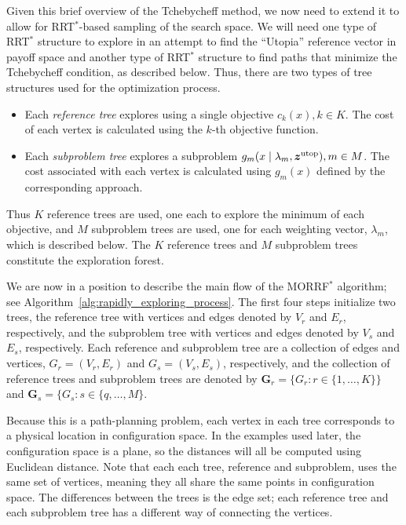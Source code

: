 \documentclass{article}
\begin{document}
Given this brief overview of the Tchebycheff method, we now need to extend it to allow for RRT$^{*}$-based sampling of the search space.  
We will need one type of RRT$^{*}$ structure to explore in an attempt to find the ``Utopia'' reference vector in payoff space and another type of RRT$^{*}$ structure to find paths that minimize the Tchebycheff condition, as described below.  
Thus, there are two types of tree structures used for the optimization process.
\begin{itemize}
\item Each \emph{reference tree} explores using a single objective $ c_{k} (x), k \in K $. 
The cost of each vertex is calculated using the $ k $-th objective function.
\item Each \emph{subproblem tree} explores a subproblem $ g_{m} ( x \mid \lambda_{m} , \bm{z}^{\rm utop} ) , m \in M $.
The cost associated with each vertex is calculated using $ g_{m}(x) $ defined by the corresponding approach.
\end{itemize}
Thus $ K $ reference trees are used, one each to explore the minimum of each objective, and $ M $ subproblem trees are used, one for each weighting vector, $ \lambda_{m} $, which is described below.  
The $K$ reference trees and $M$ subproblem trees constitute the exploration forest.

We are now in a position to describe the main flow of the MORRF$^{*}$ algorithm; see Algorithm~\ref{alg:rapidly_exploring_process}.  
The first four steps initialize two trees, the reference tree with vertices and edges denoted by $V_r$ and $E_r$, respectively, and the subproblem tree with vertices and edges denoted by $V_s$ and $E_s$, respectively.  
Each reference and subproblem tree are a collection of edges and vertices, $G_r=(V_r,E_r)$ and $G_s=(V_s,E_s)$, respectively, and the collection of reference trees and subproblem trees are denoted by ${\mathbf G}_r = \{G_r: r\in \{1, \ldots, K\}\}$ and ${\mathbf G}_s = \{G_s: s \in \{q, \ldots, M\}$.  

Because this is a path-planning problem, each vertex in each tree corresponds to a physical location in configuration space.  
In the examples used later, the configuration space is a plane, so the distances will all be computed using Euclidean distance. 
Note that each each tree, reference and subproblem, uses the same set of vertices, meaning they all share the same points in configuration space.  
The differences between the trees is the edge set; each reference tree and each subproblem tree has a different way of connecting the vertices.
\end{document}
